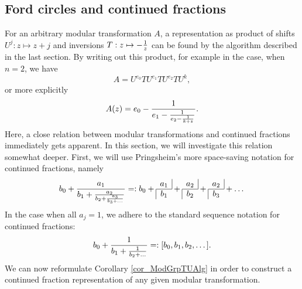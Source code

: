 \subsection{Ford circles and continued fractions}

For an arbitrary modular transformation $A$, a representation as product of shifts $U^j: z \mapsto z+j$ and inversions $T: z \mapsto -\frac{1}{z}$ can be found by the algorithm described in the last section. By writing out this product, for example in the case, when $n=2$, we have
\begin{equation*}
A = U^{e_0}T U^{e_1}T U^{e_2}T U^k,
\end{equation*}
or more explicitly
\begin{equation}
\label{eqn_ALongConFrac}
A(z) = e_0 - \frac{1}{e_1 - \frac{1}{e_2 - \frac{1}{k + z}}}.
\end{equation}
Here, a close relation between modular transformations and continued fractions immediately gets apparent. In this section, we will investigate this relation somewhat deeper. 
First, we will use Pringsheim's more space-saving notation for continued fractions, namely
\begin{equation}
\label{eqn_ConFracNotation}
b_0 + \frac{a_1}{b_1 + \frac{a_2}{b_2 + \frac{a_3}{b_3 + \dots}}} =: 
b_0 + \cfr{a_1}{b_1} + \cfr{a_2}{b_2} + \cfr{a_2}{b_3} + \dots
\end{equation}
In the case when all $a_j = 1$, we adhere to the standard sequence notation for continued fractions:
\begin{equation*}
b_0 + \frac{1}{b_1 + \frac{1}{b_2 + \dots}} =: [b_0,b_1,b_2,\dots].
\end{equation*}
We can now reformulate Corollary \ref{cor_ModGrpTUAlg} in order to construct a continued fraction representation of any given modular transformation.

